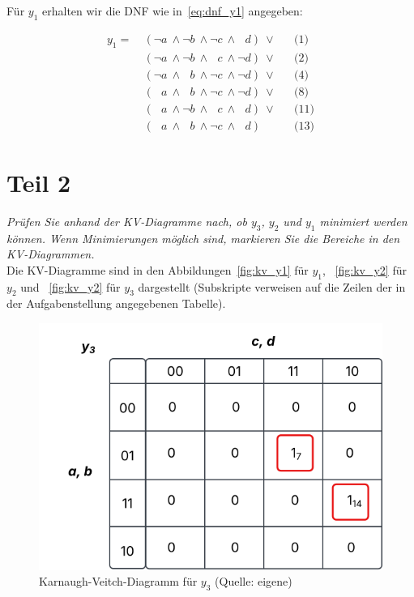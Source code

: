 \noindent
Für $y_1$ erhalten wir die DNF wie in~\ref{eq:dnf_y1} angegeben:


\begin{equation}\label{eq:dnf_y1}
\begin{alignat}{3}
    y_1 =\ &(\neg a \ \land \neg b \ \land \neg c \ \land \phantom{\neg} d)\ \lor && \text{(1)}  \\
    &(\neg a \ \land \neg b \ \land  \phantom{\neg} c \ \land \neg d)\ \lor && \text{(2)}  \\
    &(\neg a \ \land  \phantom{\neg} b \ \land \neg  c \ \land \neg d)\ \lor && \text{(4)}  \\
    &(\phantom{\neg} a \ \land  \phantom{\neg} b \ \land \neg  c \ \land \neg d)\ \lor && \text{(8)}  \\
    &(\phantom{\neg} a \ \land  \neg b \ \land \phantom{\neg} c \ \land  \phantom{\neg} d)\ \lor && \text{(11)}  \\
    &(\phantom{\neg} a \ \land   \phantom{\neg} b \ \land \neg c \ \land  \phantom{\neg} d) && \text{(13)}
\end{alignat}
\end{equation}


\section{Teil 2}

\textit{Prüfen Sie anhand der KV-Diagramme nach, ob $y_3$, $y_2$ und $y_1$ minimiert
werden können. Wenn Minimierungen möglich sind, markieren Sie die Bereiche in den KV-Diagrammen.}\\

\noindent
Die KV-Diagramme sind in den Abbildungen~\ref{fig:kv_y1} für $y_1$, ~\ref{fig:kv_y2} für $y_2$ und ~\ref{fig:kv_y2} für $y_3$ dargestellt (Subskripte verweisen auf die Zeilen der in der Aufgabenstellung angegebenen Tabelle).
\\

\begin{figure}
    \centering
    \includegraphics[scale=0.5]{aufgabe 2/img/kv_y3}
    \caption{Karnaugh-Veitch-Diagramm für $y_3$ (Quelle: eigene)}
    \label{fig:kv_y3}
\end{figure}

